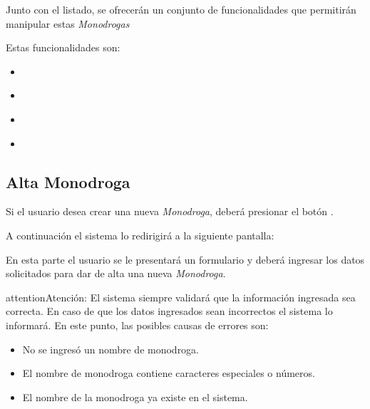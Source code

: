 \documentclass[a4paper,10pt,spanish]{sphinxmanual}
\begin{document}

Junto con el listado, se ofrecerán un conjunto de funcionalidades que permitirán manipular estas \emph{Monodrogas}

Estas funcionalidades son:
\begin{itemize}
\item {} 
{\hyperref[monodrogas:alta\string-monodroga]{}}

\item {} 
{\hyperref[monodrogas:modificar\string-monodroga]{}}

\item {} 
{\hyperref[monodrogas:eliminar\string-monodroga]{}}

\item {} 
{\hyperref[monodrogas:formulario\string-busqueda\string-monodroga]{}}

\end{itemize}


\subsection{Alta Monodroga}
\label{monodrogas:alta-monodroga}\label{monodrogas:id1}
Si el usuario desea crear una nueva \emph{Monodroga}, deberá presionar el botón .


A continuación el sistema lo redirigirá a la siguiente pantalla:


En esta parte el usuario se le presentará un formulario y deberá ingresar los datos solicitados para dar de alta una nueva \emph{Monodroga}.

\begin{notice}{attention}{Atención:}
El sistema siempre validará que la información ingresada sea correcta. En caso de que los datos ingresados sean incorrectos el sistema lo informará.
En este punto, las posibles causas de errores son:
\begin{itemize}
\item {} 
No se ingresó un nombre de monodroga.

\item {} 
El nombre de monodroga contiene caracteres especiales o números.

\item {} 
El nombre de la monodroga ya existe en el sistema.

\end{itemize}
\end{notice}
\end{document}
